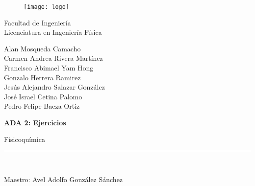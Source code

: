 \documentclass[12pt]{article}
\begin{document}
	\begin{titlepage}
		
		\begin{center}
			\vspace*{-1in}
			\begin{figure}[htb]
				\begin{center}
					\texttt{[image: logo]}
				\end{center}
			\end{figure}
			
			Facultad de Ingeniería\\
			\vspace*{0.15in}
			Licenciatura en Ingeniería Física \\
			\vspace*{0.2in}
			\begin{large}
				Alan Mosqueda Camacho\\
				Carmen Andrea Rivera Martínez\\
				Francisco Abimael Yam Hong\\
				Gonzalo Herrera Ramirez\\
				Jesús Alejandro Salazar González\\
				José Israel Cetina Palomo\\
				Pedro Felipe Baeza Ortiz\\
			\end{large}
			\vspace*{0.2in}
			\begin{Large}
				\textbf{ADA 2: Ejercicios} \\
			\end{Large}
			\vspace*{0.2in}
			\begin{large}
				Fisicoquímica \\
			\end{large}
			\vspace*{0.3in}
			\rule{80mm}{0.1mm}\\
			\vspace*{0.1in}
			\begin{large}
				Maestro: Avel Adolfo González Sánchez\\
			\end{large}
		\end{center}
		
	\end{titlepage}
\end{document}
